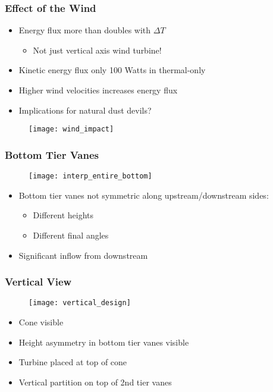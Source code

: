 \documentclass[mathserif]{beamer}
\begin{document}
%
%
%
\begin{frame}
 \frametitle{Effect of the Wind}

  \begin{itemize}
    \item Energy flux more than doubles with $\Delta T$
    \begin{itemize}
    \item Not just vertical axis wind turbine!
    \end{itemize} 
    \item Kinetic energy flux only 100 Watts in thermal-only
    \item Higher wind velocities increases energy flux
    \item Implications for natural dust devils? 
  \end{itemize}

 \begin{figure}[htb]
  \centering
  \texttt{[image: wind\_impact]}
 \end{figure}
 
\end{frame}

%
%
%
\begin{frame}
 \frametitle{Bottom Tier Vanes}
    \begin{figure}[htb]
     \centering
     \texttt{[image: interp\_entire\_bottom]}
    \end{figure}
 
 \begin{block}{}
  \begin{itemize}
   \item Bottom tier vanes not symmetric along upstream/downstream
	 sides:
	 \begin{itemize}
	  \item Different heights
	  \item Different final angles
	 \end{itemize}
   \item Significant inflow from downstream
  \end{itemize}
 \end{block}
\end{frame}

%
%
%
\begin{frame}
 \frametitle{Vertical View}
    \begin{figure}[htb]
     \centering
     \texttt{[image: vertical\_design]}
    \end{figure}
 
 \begin{block}{}
  \begin{itemize}
   \item Cone visible
   \item Height asymmetry in bottom tier vanes visible
   \item Turbine placed at top of cone
   \item Vertical partition on top of 2nd tier vanes 
  \end{itemize}
 \end{block}
\end{frame}
\end{document}
